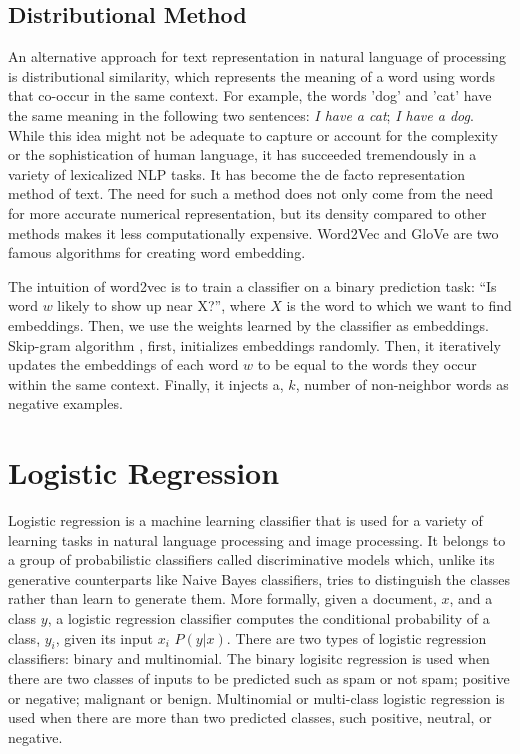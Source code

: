 \subsection{Distributional Method}
An alternative approach for text representation in natural language of processing is distributional similarity, which represents the meaning of a word using words that co-occur in the same context. For example, the words 'dog' and 'cat' have the same meaning in the following two sentences: \emph{I have a cat}; \emph{I have a dog}. While this idea might not be adequate to capture or account for the complexity or the sophistication of human language, it has succeeded tremendously in a variety of lexicalized NLP tasks. It has become the de facto representation method of text. The need for such a method does not only come from the need for more accurate numerical representation, but its density compared to other methods makes it less computationally expensive. Word2Vec \citep{mikolov2013distributed} and GloVe \citep{pennington2014glove} are two famous algorithms for creating word embedding. 

The intuition of word2vec is to train a classifier on a binary prediction task: “Is
word $w$ likely to show up near X?”, where $X$ is the word to which we want to find embeddings. Then, we use the weights learned by the classifier as embeddings. Skip-gram algorithm \citep{mikolov2013distributed} , first, initializes embeddings randomly. Then, it iteratively updates the embeddings of each word $w$ to be equal to the words they occur within the same context. Finally, it injects a, $k$, number of non-neighbor words as negative examples. 

\section{Logistic Regression}

Logistic regression is a machine learning classifier that is used for a variety of learning tasks in natural language processing and image processing. It belongs to a group of probabilistic classifiers called discriminative models which, unlike its generative counterparts like Naive Bayes classifiers, tries to distinguish the classes rather than learn to generate them. More formally, given a document, $x$, and a class $y$, a logistic regression classifier computes the conditional probability of a class, $y_i$, given its input $x_i$ $P(y|x)$. There are two types of logistic regression classifiers: binary and multinomial. The binary logisitc regression is used when there are two classes of inputs to be predicted such as spam or not spam; positive or negative; malignant or benign. Multinomial or multi-class logistic regression is used when there are more than two predicted classes, such positive, neutral, or negative.

